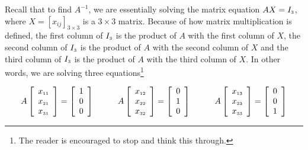 Recall that to find $A^{-1}$,  we are essentially solving the matrix equation $AX = I_{\mbox{\tiny$3$}}$, where $X = \left[ x_{ij} \right]_{3 \times 3}$ is a $3 \times 3$ matrix.  Because of how matrix multiplication is defined, the first column of $I_{\mbox{\tiny$3$}}$ is the product of $A$ with the first column of $X$, the second column of $I_{\mbox{\tiny$3$}}$ is the product of $A$ with the second column of $X$ and the third column of $I_{\mbox{\tiny$3$}}$ is the product of $A$ with the third column of $X$.  In other words, we are solving three equations\footnote{The reader is encouraged to stop and think this through.}

\[\begin{array}{ccc}

A\left[ \begin{array}{r} x_{\mbox{\tiny$11$}} \\ x_{\mbox{\tiny$21$}} \\ x_{\mbox{\tiny$31$}} \end{array} \right] = \left[ \begin{array}{r} 1 \\ 0 \\ 0 \end{array} \right]

&
\qquad
A\left[ \begin{array}{r} x_{\mbox{\tiny$12$}} \\ x_{\mbox{\tiny$22$}} \\ x_{\mbox{\tiny$32$}} \end{array} \right] = \left[ \begin{array}{r} 0 \\ 1 \\ 0 \end{array} \right] 

& 

\qquad

A\left[ \begin{array}{r} x_{\mbox{\tiny$13$}} \\ x_{\mbox{\tiny$23$}} \\ x_{\mbox{\tiny$33$}} \end{array} \right] = \left[ \begin{array}{r} 0 \\ 0 \\ 1 \end{array} \right] \\

\end{array}\]

